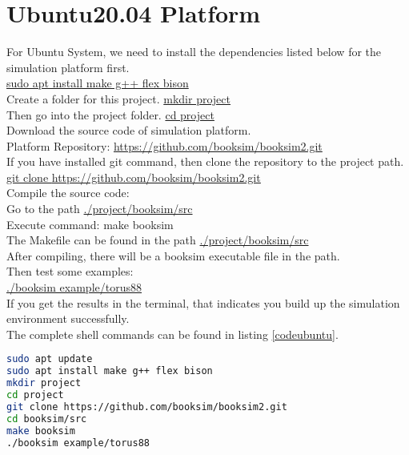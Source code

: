 \section{Ubuntu20.04 Platform}
For Ubuntu System, we need to install the dependencies listed below for the simulation platform first.\\
\underline{sudo apt install make g++ flex bison}\\
Create a folder for this project.
\underline{mkdir project}\\
Then go into the project folder. 
\underline{cd project}\\
Download the source code of simulation platform.\\
Platform Repository: \url{https://github.com/booksim/booksim2.git}\\
If you have installed git command, then clone the repository to the project path.
\underline{git clone \url{https://github.com/booksim/booksim2.git}}\\
Compile the source code:\\
Go to the path \underline{./project/booksim/src}\\
Execute command: make booksim\\
The Makefile can be found in the path \underline{./project/booksim/src}\\
After compiling, there will be a booksim executable file in the path.\\
Then test some examples:\\
\underline{./booksim example/torus88}\\
If you get the results in the terminal, that indicates you build up the simulation environment successfully.\\
The complete shell commands can be found in listing \ref{codeubuntu}.


\begin{lstlisting}[language=sh, caption= Shell Code, label = codeubuntu]
sudo apt update
sudo apt install make g++ flex bison
mkdir project
cd project
git clone https://github.com/booksim/booksim2.git
cd booksim/src
make booksim
./booksim example/torus88

\end{lstlisting}


